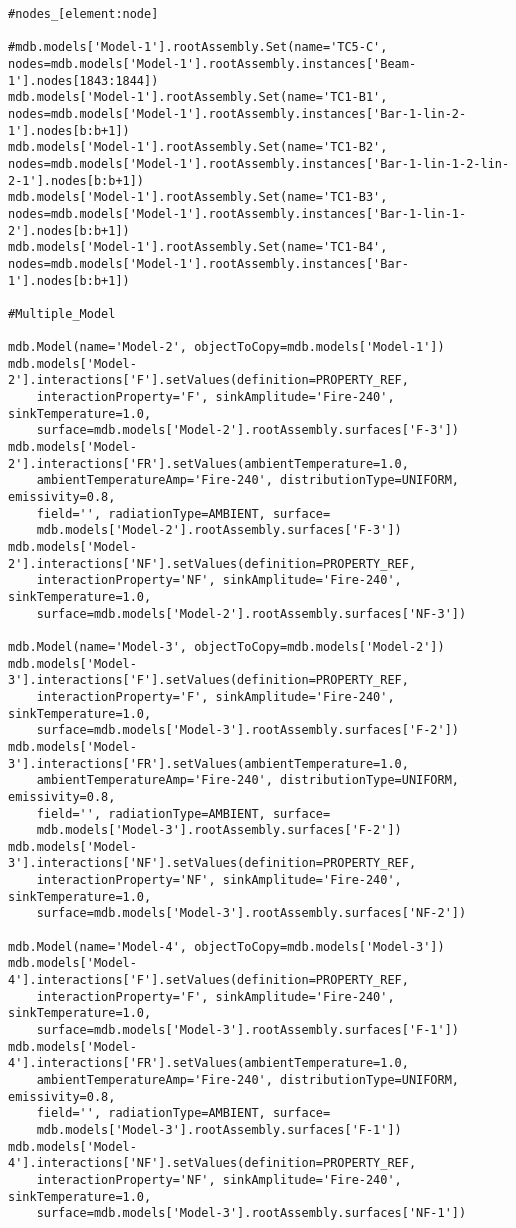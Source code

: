 \documentclass[12pt, letterpaper, oneside]{report}
\begin{document}
\begin{lstlisting}[frame=none]
#nodes_[element:node]

#mdb.models['Model-1'].rootAssembly.Set(name='TC5-C', nodes=mdb.models['Model-1'].rootAssembly.instances['Beam-1'].nodes[1843:1844])
mdb.models['Model-1'].rootAssembly.Set(name='TC1-B1', nodes=mdb.models['Model-1'].rootAssembly.instances['Bar-1-lin-2-1'].nodes[b:b+1])
mdb.models['Model-1'].rootAssembly.Set(name='TC1-B2', nodes=mdb.models['Model-1'].rootAssembly.instances['Bar-1-lin-1-2-lin-2-1'].nodes[b:b+1])
mdb.models['Model-1'].rootAssembly.Set(name='TC1-B3', nodes=mdb.models['Model-1'].rootAssembly.instances['Bar-1-lin-1-2'].nodes[b:b+1])
mdb.models['Model-1'].rootAssembly.Set(name='TC1-B4', nodes=mdb.models['Model-1'].rootAssembly.instances['Bar-1'].nodes[b:b+1])

#Multiple_Model

mdb.Model(name='Model-2', objectToCopy=mdb.models['Model-1'])
mdb.models['Model-2'].interactions['F'].setValues(definition=PROPERTY_REF, 
    interactionProperty='F', sinkAmplitude='Fire-240', sinkTemperature=1.0, 
    surface=mdb.models['Model-2'].rootAssembly.surfaces['F-3'])
mdb.models['Model-2'].interactions['FR'].setValues(ambientTemperature=1.0, 
    ambientTemperatureAmp='Fire-240', distributionType=UNIFORM, emissivity=0.8, 
    field='', radiationType=AMBIENT, surface=
    mdb.models['Model-2'].rootAssembly.surfaces['F-3'])
mdb.models['Model-2'].interactions['NF'].setValues(definition=PROPERTY_REF, 
    interactionProperty='NF', sinkAmplitude='Fire-240', sinkTemperature=1.0, 
    surface=mdb.models['Model-2'].rootAssembly.surfaces['NF-3'])
	
mdb.Model(name='Model-3', objectToCopy=mdb.models['Model-2'])
mdb.models['Model-3'].interactions['F'].setValues(definition=PROPERTY_REF, 
    interactionProperty='F', sinkAmplitude='Fire-240', sinkTemperature=1.0, 
    surface=mdb.models['Model-3'].rootAssembly.surfaces['F-2'])
mdb.models['Model-3'].interactions['FR'].setValues(ambientTemperature=1.0, 
    ambientTemperatureAmp='Fire-240', distributionType=UNIFORM, emissivity=0.8, 
    field='', radiationType=AMBIENT, surface=
    mdb.models['Model-3'].rootAssembly.surfaces['F-2'])
mdb.models['Model-3'].interactions['NF'].setValues(definition=PROPERTY_REF, 
    interactionProperty='NF', sinkAmplitude='Fire-240', sinkTemperature=1.0, 
    surface=mdb.models['Model-3'].rootAssembly.surfaces['NF-2'])

mdb.Model(name='Model-4', objectToCopy=mdb.models['Model-3'])
mdb.models['Model-4'].interactions['F'].setValues(definition=PROPERTY_REF, 
    interactionProperty='F', sinkAmplitude='Fire-240', sinkTemperature=1.0, 
    surface=mdb.models['Model-3'].rootAssembly.surfaces['F-1'])
mdb.models['Model-4'].interactions['FR'].setValues(ambientTemperature=1.0, 
    ambientTemperatureAmp='Fire-240', distributionType=UNIFORM, emissivity=0.8, 
    field='', radiationType=AMBIENT, surface=
    mdb.models['Model-3'].rootAssembly.surfaces['F-1'])
mdb.models['Model-4'].interactions['NF'].setValues(definition=PROPERTY_REF, 
    interactionProperty='NF', sinkAmplitude='Fire-240', sinkTemperature=1.0, 
    surface=mdb.models['Model-3'].rootAssembly.surfaces['NF-1'])


\end{lstlisting}
\end{document}
